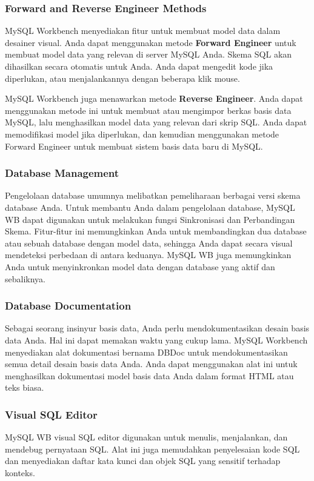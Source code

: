 \documentclass{article}
\begin{document}
\subsubsection{Forward and Reverse Engineer Methods}
MySQL Workbench menyediakan fitur untuk membuat model data dalam desainer visual. Anda dapat menggunakan metode \textbf{Forward Engineer} untuk membuat model data yang relevan di server MySQL Anda. Skema SQL akan dihasilkan secara otomatis untuk Anda. Anda dapat mengedit kode jika diperlukan, atau menjalankannya dengan beberapa klik mouse.

MySQL Workbench juga menawarkan metode \textbf{Reverse Engineer}. Anda dapat menggunakan metode ini untuk membuat atau mengimpor berkas basis data MySQL, lalu menghasilkan model data yang relevan dari skrip SQL. Anda dapat memodifikasi model jika diperlukan, dan kemudian menggunakan metode Forward Engineer untuk membuat sistem basis data baru di MySQL.

\subsubsection{Database Management}
Pengelolaan database umumnya melibatkan pemeliharaan berbagai versi skema database Anda. Untuk membantu Anda dalam pengelolaan database, MySQL WB dapat digunakan untuk melakukan fungsi Sinkronisasi dan Perbandingan Skema. Fitur-fitur ini memungkinkan Anda untuk membandingkan dua database atau sebuah database dengan model data, sehingga Anda dapat secara visual mendeteksi perbedaan di antara keduanya. MySQL WB juga memungkinkan Anda untuk menyinkronkan model data dengan database yang aktif dan sebaliknya.

\subsubsection{Database Documentation}
Sebagai seorang insinyur basis data, Anda perlu mendokumentasikan desain basis data Anda. Hal ini dapat memakan waktu yang cukup lama. MySQL Workbench menyediakan alat dokumentasi bernama DBDoc untuk mendokumentasikan semua detail desain basis data Anda. Anda dapat menggunakan alat ini untuk menghasilkan dokumentasi model basis data Anda dalam format HTML atau teks biasa.

\subsubsection{Visual SQL Editor}
MySQL WB visual SQL editor digunakan untuk menulis, menjalankan, dan mendebug pernyataan SQL. Alat ini juga memudahkan penyelesaian kode SQL dan menyediakan daftar kata kunci dan objek SQL yang sensitif terhadap konteks.
\end{document}
